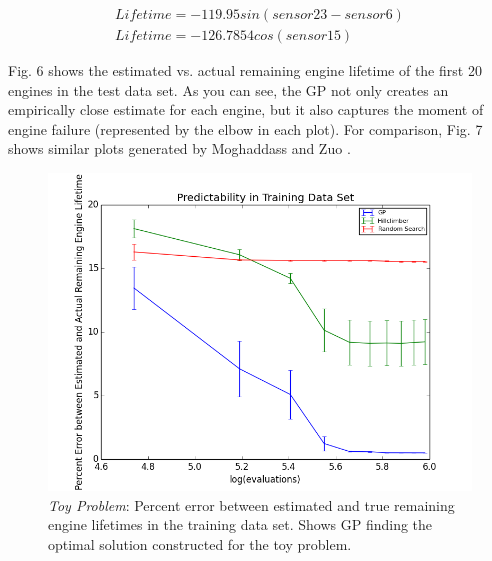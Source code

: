 \documentclass{acm_proc_article-sp}
\begin{document}
\begin{eqnarray}
Lifetime = -119.95sin(sensor23 - sensor 6)
\\
Lifetime = -126.7854cos(sensor15)
\end{eqnarray}

Fig. 6 shows the estimated vs. actual remaining engine lifetime of the first 20 engines in the test data set. As you can see, the GP not only creates an empirically close estimate for each engine, but it also captures the moment of engine failure (represented by the elbow in each plot). For comparison, Fig. 7 shows similar plots generated by Moghaddass and Zuo \cite{Mog}.

\begin{figure}
\centering
\includegraphics[scale=0.65]{bigplot_one_slice.png}
\caption{{\it{Toy Problem}}: Percent error between estimated and true remaining engine lifetimes in the training data set. Shows GP finding the optimal solution constructed for the toy problem.}
\end{figure}
\end{document}
